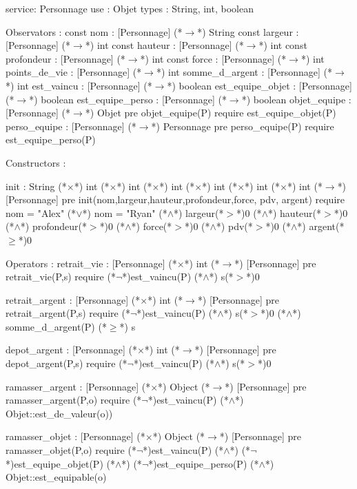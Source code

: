 \documentclass[a4paper, 11pt, notitlepage]{report}
\begin{document}
\begin{Spe}
service: Personnage
use : Objet
types : String, int, boolean

Observators : 
	const nom : [Personnage] (*$\rightarrow$*) String
	const largeur : [Personnage] (*$\rightarrow$*) int
	const hauteur : [Personnage] (*$\rightarrow$*) int
	const profondeur : [Personnage] (*$\rightarrow$*) int
	const force : [Personnage] (*$\rightarrow$*) int 
	points_de_vie : [Personnage] (*$\rightarrow$*) int
	somme_d_argent : [Personnage] (*$\rightarrow$*) int 
	est_vaincu : [Personnage] (*$\rightarrow$*) boolean 
	est_equipe_objet : [Personnage] (*$\rightarrow$*) boolean
	est_equipe_perso : [Personnage] (*$\rightarrow$*) boolean 
	objet_equipe : [Personnage] (*$\rightarrow$*) Objet
		pre objet_equipe(P) require est_equipe_objet(P)
	perso_equipe : [Personnage] (*$\rightarrow$*) Personnage
		pre perso_equipe(P) require est_equipe_perso(P) 

Constructors : 

	init : String (*$\times$*) int (*$\times$*) int (*$\times$*) int (*$\times$*) int (*$\times$*) int (*$\times$*) int (*$\rightarrow$*) [Personnage]
		pre init(nom,largeur,hauteur,profondeur,force, pdv, argent) require nom = "Alex" (*$\lor$*) nom = "Ryan" (*$\land$*) largeur(*$>$*)0 (*$\land$*) hauteur(*$>$*)0 (*$\land$*) profondeur(*$>$*)0 (*$\land$*) force(*$>$*)0 (*$\land$*) pdv(*$>$*)0 (*$\land$*) argent(*$\ge$*)0 

Operators :
	retrait_vie :  [Personnage] (*$\times$*) int (*$\rightarrow$*) [Personnage]
		pre retrait_vie(P,s) require (*$\lnot$*)est_vaincu(P) (*$\land$*) s(*$>$*)0

	retrait_argent :  [Personnage] (*$\times$*) int (*$\rightarrow$*) [Personnage]
		pre retrait_argent(P,s) require (*$\lnot$*)est_vaincu(P) (*$\land$*) s(*$>$*)0 (*$\land$*) somme_d_argent(P) (*$\ge$*) s 
		
	depot_argent : [Personnage] (*$\times$*) int (*$\rightarrow$*) [Personnage]
		pre depot_argent(P,s) require (*$\lnot$*)est_vaincu(P) (*$\land$*) s(*$>$*)0

	ramasser_argent : [Personnage] (*$\times$*) Object (*$\rightarrow$*) [Personnage]
		pre ramasser_argent(P,o) require (*$\lnot$*)est_vaincu(P) (*$\land$*) Objet::est_de_valeur(o))	

	ramasser_objet : [Personnage] (*$\times$*) Object (*$\rightarrow$*) [Personnage]
		pre ramasser_objet(P,o) require (*$\lnot$*)est_vaincu(P) (*$\land$*) (*$\lnot$*)est_equipe_objet(P) (*$\land$*)  (*$\lnot$*)est_equipe_perso(P) (*$\land$*) Objet::est_equipable(o)
		

\end{Spe}
\end{document}
